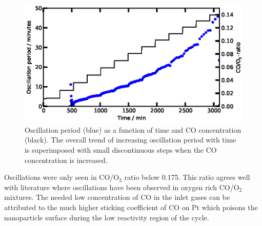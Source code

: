 \documentclass[journal=jacsat,manuscript=article]{achemso}
\begin{document}
\begin{figure}
  \includegraphics[width=12cm]{oscil_gas_dependence_summary.eps}
  \caption{Oscillation period (blue) as a function of time and CO concentration (black). The
  overall trend of increasing oscillation period with time is superimposed with small
  discontinuous steps when the CO concentration is increased.} 
  \label{fgr:gas_dependence_summary}
\end{figure}

Oscillations were only seen in CO/O$_2$ ratio below 0.175. This ratio agrees
well with literature \cite{Singh2010,Hendriksen2005} where oscillations have
been observed in oxygen rich CO/O$_2$ mixtures. The needed low concentration of
CO in the inlet gases can be attributed to the much higher sticking coefficient
of CO on Pt which poisons the nanoparticle surface during the low reactivity
region of the cycle.
\end{document}
